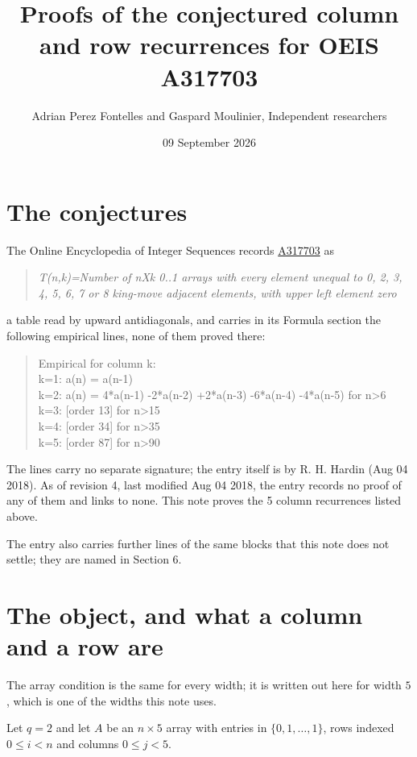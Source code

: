 \documentclass[11pt]{article}
\title{Proofs of the conjectured column and row recurrences for OEIS A317703}
\author{Adrian Perez Fontelles and Gaspard Moulinier, Independent researchers}
\date{09 September 2026}
\theoremstyle{definition}
\begin{document}
\maketitle
\section{The conjectures}

The Online Encyclopedia of Integer Sequences records \href{https://oeis.org/A317703}{A317703} as

\begin{quote}\itshape T(n,k)=Number of nXk 0..1 arrays with every element unequal to 0, 2, 3, 4, 5, 6, 7 or 8 king-move adjacent elements, with upper left element zero\end{quote}

a table read by upward antidiagonals, and carries in its Formula section the following empirical lines, none of them proved there:

\begin{quote}\ttfamily Empirical for column k:\\
k=1: a(n) = a(n-1)\\k=2: a(n) = 4*a(n-1) -2*a(n-2) +2*a(n-3) -6*a(n-4) -4*a(n-5) for n>6\\k=3: [order 13] for n>15\\k=4: [order 34] for n>35\\k=5: [order 87] for n>90\end{quote}

The lines carry no separate signature; the entry itself is by R. H. Hardin (Aug 04 2018). As of revision 4, last modified Aug 04 2018, the entry records no proof of any of them and links to none. This note proves the 5 column recurrences listed above.

The entry also carries further lines of the same blocks that this note does not settle; they are named in Section 6.

\section{The object, and what a column and a row are}

The array condition is the same for every width; it is written out here for width $5$, which is one of the widths this note uses.

Let $q = 2$ and let $A$ be an $n \times 5$ array with entries in $\{0,1,\dots,1\}$, rows indexed $0 \le i < n$ and columns $0 \le j < 5$.
\end{document}
